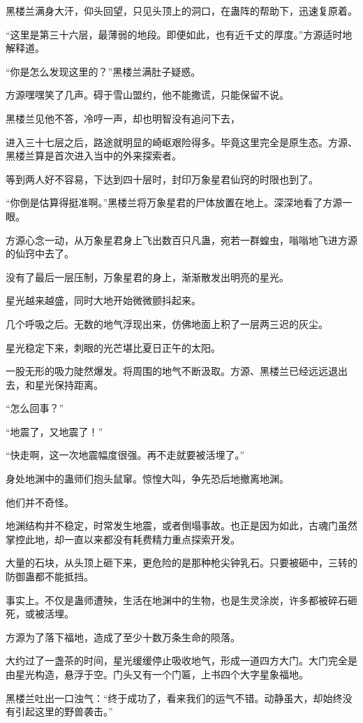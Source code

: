 \begin{this_body}
黑楼兰满身大汗，仰头回望，只见头顶上的洞口，在蛊阵的帮助下，迅速复原着。

“这里是第三十六层，最薄弱的地段。即便如此，也有近千丈的厚度。”方源适时地解释道。

“你是怎么发现这里的？”黑楼兰满肚子疑惑。

方源嘿嘿笑了几声。碍于雪山盟约，他不能撒谎，只能保留不说。

黑楼兰见他不答，冷哼一声，却也明智没有追问下去，

进入三十七层之后，路途就明显的崎岖艰险得多。毕竟这里完全是原生态。方源、黑楼兰算是首次进入当中的外来探索者。

等到两人好不容易，下达到四十层时，封印万象星君仙窍的时限也到了。

“你倒是估算得挺准啊。”黑楼兰将万象星君的尸体放置在地上。深深地看了方源一眼。

方源心念一动，从万象星君身上飞出数百只凡蛊，宛若一群蝗虫，嗡嗡地飞进方源的仙窍中去了。

没有了最后一层压制，万象星君的身上，渐渐散发出明亮的星光。

星光越来越盛，同时大地开始微微颤抖起来。

几个呼吸之后。无数的地气浮现出来，仿佛地面上积了一层两三迟的灰尘。

星光稳定下来，刺眼的光芒堪比夏日正午的太阳。

一股无形的吸力陡然爆发。将周围的地气不断汲取。方源、黑楼兰已经远远退出去，和星光保持距离。

“怎么回事？”

“地震了，又地震了！”

“快走啊，这一次地震幅度很强。再不走就要被活埋了。”

身处地渊中的蛊师们抱头鼠窜。惊惶大叫，争先恐后地撤离地渊。

他们并不奇怪。

地渊结构并不稳定，时常发生地震，或者倒塌事故。也正是因为如此，古魂门虽然掌控此地，却一直以来都没有耗费精力重点探索开发。

大量的石块，从头顶上砸下来，更危险的是那种枪尖钟乳石。只要被砸中，三转的防御蛊都不能抵挡。

事实上。不仅是蛊师遭殃，生活在地渊中的生物，也是生灵涂炭，许多都被碎石砸死，或被活埋。

方源为了落下福地，造成了至少十数万条生命的陨落。

大约过了一盏茶的时间，星光缓缓停止吸收地气，形成一道四方大门。大门完全是由星光构造，悬浮于空。门头又有一个门匾，上书四个大字星象福地。

黑楼兰吐出一口浊气：“终于成功了，看来我们的运气不错。动静虽大，却始终没有引起这里的野兽袭击。”


\end{this_body}
